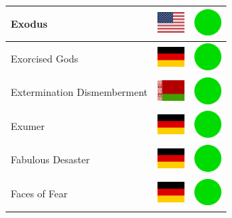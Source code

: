 \documentclass[12pt, a4paper, twoside]{report}
\begin{document}
\begin{center}
\begin{longtable}{|p{5cm}|p{2cm}|p{2cm}|}
 Exodus                                                     & \includegraphics[width=1cm]{../img/flags/us} &   \includegraphics[width=1cm]{../likes/y} \\ \hline
 Exorcised Gods                                             & \includegraphics[width=1cm]{../img/flags/de} &   \includegraphics[width=1cm]{../likes/y} \\ \hline
 Extermination Dismemberment                                & \includegraphics[width=1cm]{../img/flags/by} &   \includegraphics[width=1cm]{../likes/y} \\ \hline
 Exumer                                                     & \includegraphics[width=1cm]{../img/flags/de} &   \includegraphics[width=1cm]{../likes/y} \\ \hline
 Fabulous Desaster                                          & \includegraphics[width=1cm]{../img/flags/de} &   \includegraphics[width=1cm]{../likes/y} \\ \hline
 Faces of Fear                                              & \includegraphics[width=1cm]{../img/flags/de} &   \includegraphics[width=1cm]{../likes/y} \\ \hline

\end{longtable}
\end{center}
\end{document}
